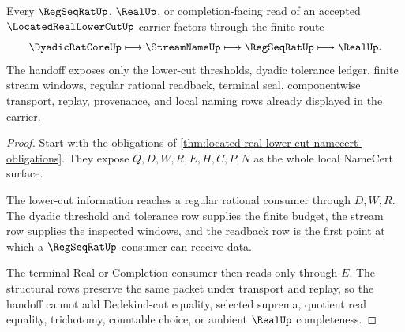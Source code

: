 \begin{theorem}
\label{thm:located-real-lower-cut-regseqrat-handoff}
Every $\RegSeqRatUp$, $\RealUp$, or completion-facing read of an accepted $\LocatedRealLowerCutUp$ carrier factors through the finite route
$$
\DyadicRatCoreUp\longmapsto\StreamNameUp\longmapsto\RegSeqRatUp\longmapsto\RealUp .
$$
The handoff exposes only the lower-cut thresholds, dyadic tolerance ledger, finite stream windows, regular rational readback, terminal seal, componentwise transport, replay, provenance, and local naming rows already displayed in the carrier.
\end{theorem}
\begin{proof}
Start with the obligations of \autoref{thm:located-real-lower-cut-namecert-obligations}. They expose $Q,D,W,R,E,H,C,P,N$ as the whole local NameCert surface.

The lower-cut information reaches a regular rational consumer through $D,W,R$. The dyadic threshold and tolerance row supplies the finite budget, the stream row supplies the inspected windows, and the readback row is the first point at which a $\RegSeqRatUp$ consumer can receive data.

The terminal Real or Completion consumer then reads only through $E$. The structural rows preserve the same packet under transport and replay, so the handoff cannot add Dedekind-cut equality, selected suprema, quotient real equality, trichotomy, countable choice, or ambient $\RealUp$ completeness.
\end{proof}


\begin{closurestatus}{\LocatedRealLowerCutUp}
  \theoryclosure{\seedClosure}
  \formalstatus{\unformalizedV}
\end{closurestatus}
